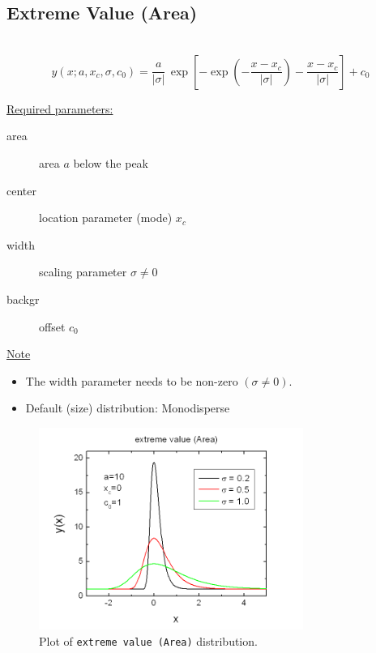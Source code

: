 \clearpage
\subsection{Extreme Value (Area)} ~\\
\label{sec:ExtremeValueArea}
\begin{equation}
y(x;a,x_c,\sigma,c_0) = \frac{a}{|\sigma|} \,
\exp\left[-\exp\left(-\frac{x-x_c}{|\sigma|}\right)-\frac{x-x_c}{|\sigma|}\right]
+c_0
\end{equation}
\vspace{5mm}

\uline{Required parameters:}
\begin{description}
    \item[area] area $a$ below the peak
    \item[center] location parameter (mode) $x_c$
    \item[width] scaling parameter $\sigma \neq 0$
    \item[backgr] offset $c_0$
\end{description}

\uline{Note}
\begin{itemize}
  \item The width parameter needs to be non-zero $(\sigma\neq 0)$.
  \item Default (size) distribution: Monodisperse
\end{itemize}
\begin{figure}[htb]
\begin{center}
\includegraphics[width=0.768\textwidth]{ExtremeValueArea.png}
\end{center}
\caption{Plot of \texttt{extreme value (Area)} distribution.}
\label{fig:ExtremeValueArea}
\end{figure}

